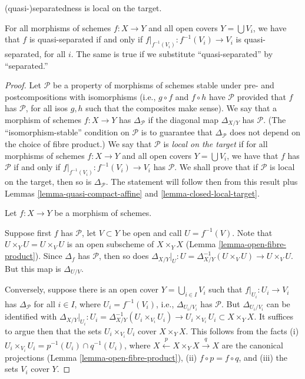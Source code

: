 \begin{lemma}
\label{quasi-separated-local-target}
\begin{slogan}
(quasi-)separatedness is local on the target.
\end{slogan}
For all morphisms of schemes $f:X\to Y$ and all open covers $Y=\bigcup V_i$,
we have that $f$ is quasi-separated if and only if
$f|_{f^{-1}(V_i)}:f^{-1}(V_i)\to V_i$ is quasi-separated, for all $i$.
The same is true if we substitute ``quasi-separated'' by ``separated.''
\end{lemma}

\begin{proof}
Let $\mathcal{P}$ be a property of morphisms of schemes stable
under pre- and postcompositions with isomorphisms
(i.e., $g\circ f$ and $f\circ h$ have $\mathcal{P}$
provided that $f$ has $\mathcal{P}$, for all isos $g,h$
such that the composites make sense).
We say that a morphism of schemes $f:X\to Y$ has $\Delta_\mathcal{P}$
if the diagonal map $\Delta_{X/Y}$ has $\mathcal{P}$.
(The ``isomorphism-stable'' condition on $\mathcal{P}$ is to guarantee
that $\Delta_\mathcal{P}$ does not depend on the choice of fibre product.)
We say that $\mathcal{P}$ is {\it local on the target}
if for all morphisms of schemes $f:X\to Y$ and all open covers $Y=\bigcup V_i$,
we have that $f$ has $\mathcal{P}$ if and only if
$f|_{f^{-1}(V_i)}:f^{-1}(V_i)\to V_i$ has $\mathcal{P}$.
We shall prove that if $\mathcal{P}$ is local on the target,
then so is $\Delta_\mathcal{P}$.
The statement will follow then from this result plus
Lemmas \ref{lemma-quasi-compact-affine} and
\ref{lemma-closed-local-target}.
	
\medskip\noindent
Let $f:X\to Y$ be a morphism of schemes.

\medskip\noindent
Suppose first $f$ has $\mathcal{P}$, let $V\subset Y$ be open and call $U=f^{-1}(V)$.
Note that $U\times_Y U=U\times_V U$ is an open subscheme of $X\times_Y X$
(Lemma \ref{lemma-open-fibre-product}). Since $\Delta_f$ has $\mathcal{P}$,
then so does $\Delta_{X/Y}|_{U}:U=\Delta_{X/Y}^{-1}(U\times_V U)\to U\times_V U$.
But this map is $\Delta_{U/V}$.

\medskip\noindent
Conversely, suppose there is an open cover $Y=\bigcup_{i\in I}V_i$
such that $f|_{U_i}:U_i\to V_i$ has $\Delta_\mathcal{P}$ for all $i\in I$,
where $U_i=f^{-1}(V_i)$, i.e., $\Delta_{U_i/V_i}$ has $\mathcal{P}$.
But $\Delta_{U_i/V_i}$ can be identified with
$\Delta_{X/Y}|_{U_i}:U_i
=\Delta_{X/Y}^{-1}(U_i\times_{V_i}U_i)
\to U_i\times_{V_i}U_i\subset X\times_Y X$.
It suffices to argue then that the sets $U_i\times_{V_i}U_i$ cover $X\times_Y X$.
This follows from the facts
(i) $U_i\times_{V_i}U_i=p^{-1}(U_i)\cap q^{-1}(U_i)$,
where $X\xleftarrow{p}X\times_Y X\xrightarrow{q}X$ are the canonical projections
(Lemma \ref{lemma-open-fibre-product}),
(ii) $f\circ p=f\circ q$, and
(iii) the sets $V_i$ cover $Y$.
\end{proof}

